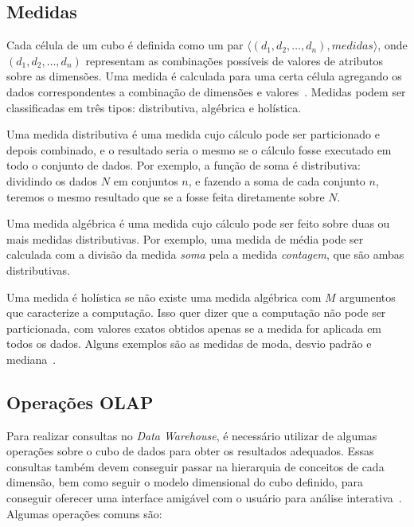 \subsection{Medidas}\label{ch:fun:cube:measures}

Cada célula de um cubo é definida como um par $\langle (d_1, d_2, \ldots, d_n), medidas\rangle$, onde $(d_1, d_2, \ldots, d_n)$ representam as combinações possíveis de valores de atributos sobre as dimensões.
Uma medida é calculada para uma certa célula agregando os dados correspondentes a combinação de dimensões e valores~\cite{hanDataMiningConcepts2011}.
Medidas podem ser classificadas em três tipos: distributiva, algébrica e holística.

Uma medida distributiva é uma medida cujo cálculo pode ser particionado e depois combinado, e o resultado seria o mesmo se o cálculo fosse executado em todo o conjunto de dados.
Por exemplo, a função de soma é distributiva: dividindo os dados $N$ em conjuntos $n$, e fazendo a soma de cada conjunto $n$, teremos o mesmo resultado que se a fosse feita diretamente sobre $N$.

Uma medida algébrica é uma medida cujo cálculo pode ser feito sobre duas ou mais medidas distributivas.
Por exemplo, uma medida de média pode ser calculada com a divisão da medida \textit{soma} pela a medida \textit{contagem}, que são ambas distributivas.

Uma medida é holística se não existe uma medida algébrica com $M$ argumentos que caracterize a computação.
Isso quer dizer que a computação não pode ser particionada, com valores exatos obtidos apenas se a medida for aplicada em todos os dados.
Alguns exemplos são as medidas de moda, desvio padrão e mediana~\cite{hanDataMiningConcepts2011}.

\subsection{Operações OLAP}\label{ch:fun:cube:olapops}

Para realizar consultas no \textit{Data Warehouse}, é necessário utilizar de algumas operações sobre o cubo de dados para obter os resultados adequados.
Essas consultas também devem conseguir passar na hierarquia de conceitos de cada dimensão, bem como seguir o modelo dimensional do cubo definido, para conseguir oferecer uma interface amigável com o usuário para análise interativa~\cite{hanDataMiningConcepts2011}.
Algumas operações comuns são:

